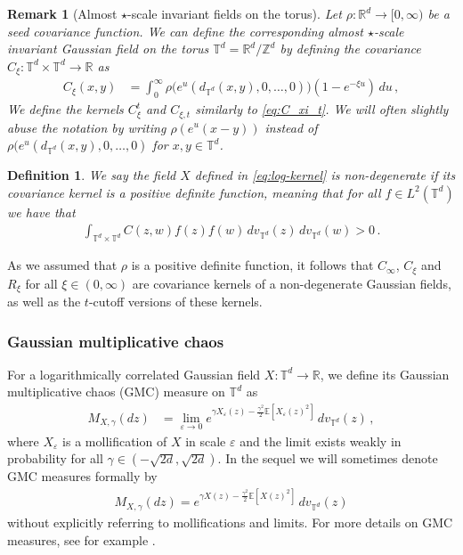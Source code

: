 \documentclass[11pt]{article}
\numberwithin{equation}{section}
\newcounter{exa}
\newtheorem{remark}[theorem]{Remark}
\newtheorem{definition}[theorem]{Definition}
\theoremstyle{definition}
\newcommand{\R}{\mathbb{R}}
\newcommand{\Z}{\mathbb{Z}}
\newcommand{\E}{\mathbb{E}}
\def\eps{\varepsilon}
\def\T{\mathbb{T}}
\begin{document}
\begin{remark}[Almost $\star$-scale invariant fields on the torus]\label{rem:star_torus}
Let $\rho:\R^d \to [0,\infty)$ be a seed covariance function. We can define the corresponding almost $\star$-scale invariant Gaussian field on the torus $\mathbb{T}^d = \R^d/\Z^d$ by defining the covariance $C_\xi: \mathbb{T}^d \times \mathbb{T}^d \to \R$ as
\begin{align*}
C_\xi(x,y) &= \int_0^\infty \rho \big( e^u (d_{\T^d}(x,y), 0, \hdots,0) \big) (1 - e^{-\xi u}) \, du \,,
\end{align*}
We define the kernels $C_\xi^t$ and $C_{\xi,t}$ similarly to \eqref{eq:C_xi_t}. We will often slightly abuse the notation by writing $\rho(e^u(x-y))$ instead of $\rho \big( e^u (d_{\T^d}(x,y), 0, \hdots,0)$ for $x,y \in \T^d$.
\end{remark}

\begin{definition}
We say the field $X$ defined in \eqref{eq:log-kernel} is \emph{non-degenerate} if its covariance kernel is a positive definite function, meaning that for all $f \in L^2(\T^d)$ we have that
\begin{align}\label{eq:non_degenerate}
\int_{\T^d \times \T^d} C(z,w) f(z) f(w) \, dv_{\T^d}(z) \, dv_{\T^d}(w)  > 0\,.
\end{align}
\end{definition}
\noindent As we assumed that $\rho$ is a positive definite function, it follows that $C_\infty$, $C_\xi$ and $R_\xi$ for all $\xi \in (0,\infty)$ are covariance kernels of a non-degenerate Gaussian fields, as well as the $t$-cutoff versions of these kernels.

\subsubsection{Gaussian multiplicative chaos} For a logarithmically correlated Gaussian field $X: \T^d \to \R$, we define its Gaussian multiplicative chaos (GMC) measure on $\T^d$ as 
\begin{align}\label{gmc_formal}
M_{X,\gamma}(dz) &= \lim_{\eps \to 0} e^{\gamma X_\eps(z) - \frac{\gamma^2}{2} \E[X_\eps(z)^2]} \, dv_{\T^d}(z)\,,
\end{align}
where $X_\eps$ is a mollification of $X$ in scale $\eps$ and the limit exists weakly in probability for all $\gamma \in (-\sqrt{2d}, \sqrt{2d})$. In the sequel we will sometimes denote GMC measures formally by
\begin{align*}
M_{X,\gamma}(dz) = e^{\gamma X(z) - \frac{\gamma^2}{2} \E[X(z)^2]} \, dv_{\T^d}(z)
\end{align*}
without explicitly referring to mollifications and limits. For more details on GMC measures, see for example \cite{BePo, review}.
\end{document}
